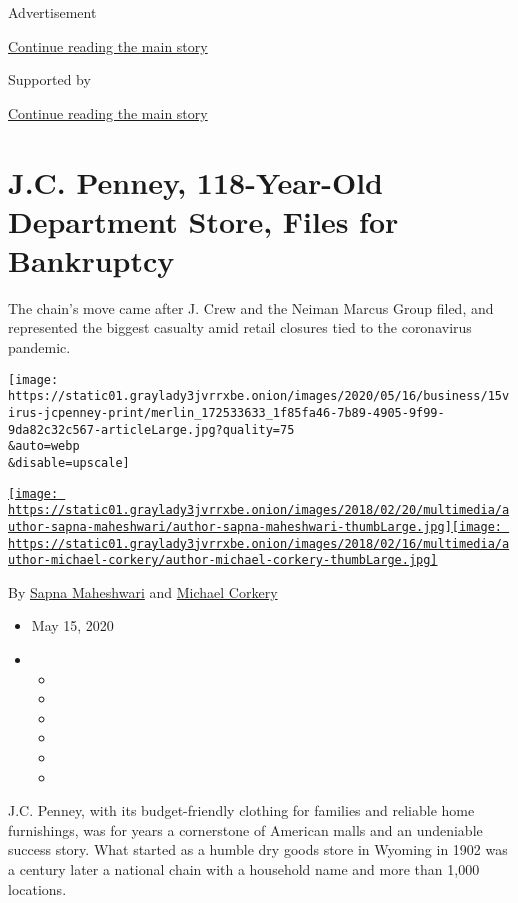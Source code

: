 Advertisement

\protect\hyperlink{after-top}{Continue reading the main story}

Supported by

\protect\hyperlink{after-sponsor}{Continue reading the main story}

\hypertarget{jc-penney-118-year-old-department-store-files-for-bankruptcy}{%
\section{J.C. Penney, 118-Year-Old Department Store, Files for
Bankruptcy}\label{jc-penney-118-year-old-department-store-files-for-bankruptcy}}

The chain's move came after J. Crew and the Neiman Marcus Group filed,
and represented the biggest casualty amid retail closures tied to the
coronavirus pandemic.

\texttt{[image: https://static01.graylady3jvrrxbe.onion/images/2020/05/16/business/15virus-jcpenney-print/merlin\_172533633\_1f85fa46-7b89-4905-9f99-9da82c32c567-articleLarge.jpg?quality=75\\\&auto=webp\\\&disable=upscale]}

\href{https://www.nytimes3xbfgragh.onion/by/sapna-maheshwari}{\texttt{[image: https://static01.graylady3jvrrxbe.onion/images/2018/02/20/multimedia/author-sapna-maheshwari/author-sapna-maheshwari-thumbLarge.jpg]}}\href{https://www.nytimes3xbfgragh.onion/by/michael-corkery}{\texttt{[image: https://static01.graylady3jvrrxbe.onion/images/2018/02/16/multimedia/author-michael-corkery/author-michael-corkery-thumbLarge.jpg]}}

By \href{https://www.nytimes3xbfgragh.onion/by/sapna-maheshwari}{Sapna
Maheshwari} and
\href{https://www.nytimes3xbfgragh.onion/by/michael-corkery}{Michael
Corkery}

\begin{itemize}
\item
  May 15, 2020
\item
  \begin{itemize}
  \item
  \item
  \item
  \item
  \item
  \item
  \end{itemize}
\end{itemize}

J.C. Penney, with its budget-friendly clothing for families and reliable
home furnishings, was for years a cornerstone of American malls and an
undeniable success story. What started as a humble dry goods store in
Wyoming in 1902 was a century later a national chain with a household
name and more than 1,000 locations.

